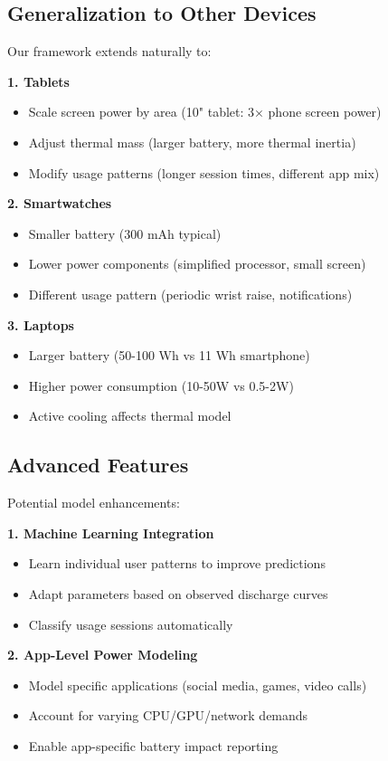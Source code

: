 \documentclass[12pt]{article}
\begin{document}
\subsection{Generalization to Other Devices}

Our framework extends naturally to:

\textbf{1. Tablets}
\begin{itemize}
\item Scale screen power by area (10" tablet: 3× phone screen power)
\item Adjust thermal mass (larger battery, more thermal inertia)
\item Modify usage patterns (longer session times, different app mix)
\end{itemize}

\textbf{2. Smartwatches}
\begin{itemize}
\item Smaller battery (300 mAh typical)
\item Lower power components (simplified processor, small screen)
\item Different usage pattern (periodic wrist raise, notifications)
\end{itemize}

\textbf{3. Laptops}
\begin{itemize}
\item Larger battery (50-100 Wh vs 11 Wh smartphone)
\item Higher power consumption (10-50W vs 0.5-2W)
\item Active cooling affects thermal model
\end{itemize}

\subsection{Advanced Features}

Potential model enhancements:

\textbf{1. Machine Learning Integration}
\begin{itemize}
\item Learn individual user patterns to improve predictions
\item Adapt parameters based on observed discharge curves
\item Classify usage sessions automatically
\end{itemize}

\textbf{2. App-Level Power Modeling}
\begin{itemize}
\item Model specific applications (social media, games, video calls)
\item Account for varying CPU/GPU/network demands
\item Enable app-specific battery impact reporting
\end{itemize}
\end{document}
